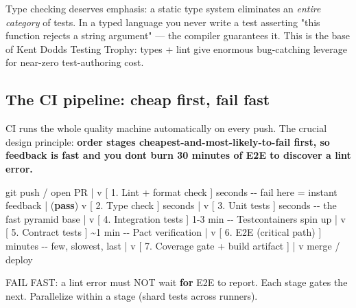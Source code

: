 \documentclass[11pt]{article}
\newenvironment{Shaded}{\begin{snugshade}}{\end{snugshade}}
\newcommand{\BuiltInTok}[1]{\textcolor[rgb]{0.50,0.55,0.55}{#1}}
\newcommand{\ControlFlowTok}[1]{\textcolor[rgb]{0.99,0.74,0.29}{\textbf{#1}}}
\newcommand{\DecValTok}[1]{\textcolor[rgb]{0.96,0.45,0.00}{#1}}
\newcommand{\FloatTok}[1]{\textcolor[rgb]{0.96,0.45,0.00}{#1}}
\newcommand{\NormalTok}[1]{\textcolor[rgb]{0.81,0.81,0.76}{#1}}
\newcommand{\OperatorTok}[1]{\textcolor[rgb]{0.81,0.81,0.76}{#1}}
\begin{document}
Type checking deserves emphasis: a static type system eliminates an \emph{entire category} of tests. In a typed language you never write a test asserting "this function rejects a string argument" --- the compiler guarantees it. This is the base of Kent Dodds\textquotesingle{} Testing Trophy: types + lint give enormous bug-catching leverage for near-zero test-authoring cost.

\subsection{The CI pipeline: cheap first, fail fast}\label{the-ci-pipeline-cheap-first-fail-fast}

CI runs the whole quality machine automatically on every push. The crucial design principle: \textbf{order stages cheapest-and-most-likely-to-fail first, so feedback is fast and you don\textquotesingle t burn 30 minutes of E2E to discover a lint error.}


\begin{Shaded}
\begin{Highlighting}[]
\NormalTok{   git push }\OperatorTok{/} \BuiltInTok{open}\NormalTok{ PR}
        \OperatorTok{|}
\NormalTok{        v}
\NormalTok{   [ }\FloatTok{1.}\NormalTok{ Lint }\OperatorTok{+} \BuiltInTok{format}\NormalTok{ check ]   seconds   }\OperatorTok{{-}{-}}\NormalTok{ fail here }\OperatorTok{=}\NormalTok{ instant feedback}
        \OperatorTok{|}\NormalTok{  (}\ControlFlowTok{pass}\NormalTok{)}
\NormalTok{        v}
\NormalTok{   [ }\FloatTok{2.}\NormalTok{ Type check ]            seconds}
        \OperatorTok{|}
\NormalTok{        v}
\NormalTok{   [ }\FloatTok{3.}\NormalTok{ Unit tests ]           seconds    }\OperatorTok{{-}{-}}\NormalTok{ the fast pyramid base}
        \OperatorTok{|}
\NormalTok{        v}
\NormalTok{   [ }\FloatTok{4.}\NormalTok{ Integration tests ]    }\DecValTok{1}\OperatorTok{{-}}\DecValTok{3} \BuiltInTok{min}    \OperatorTok{{-}{-}}\NormalTok{ Testcontainers spin up}
        \OperatorTok{|}
\NormalTok{        v}
\NormalTok{   [ }\FloatTok{5.}\NormalTok{ Contract tests ]       }\OperatorTok{\textasciitilde{}}\DecValTok{1} \BuiltInTok{min}     \OperatorTok{{-}{-}}\NormalTok{ Pact verification}
        \OperatorTok{|}
\NormalTok{        v}
\NormalTok{   [ }\FloatTok{6.}\NormalTok{ E2E (critical path) ]  minutes    }\OperatorTok{{-}{-}}\NormalTok{ few, slowest, last}
        \OperatorTok{|}
\NormalTok{        v}
\NormalTok{   [ }\FloatTok{7.}\NormalTok{ Coverage gate }\OperatorTok{+}\NormalTok{ build artifact ]}
        \OperatorTok{|}
\NormalTok{        v}
\NormalTok{   merge }\OperatorTok{/}\NormalTok{ deploy}

\NormalTok{   FAIL FAST: a lint error must NOT wait }\ControlFlowTok{for}\NormalTok{ E2E to report. Each stage}
\NormalTok{   gates the }\BuiltInTok{next}\NormalTok{. Parallelize within a stage (shard tests across runners).}
\end{Highlighting}
\end{Shaded}
\end{document}
